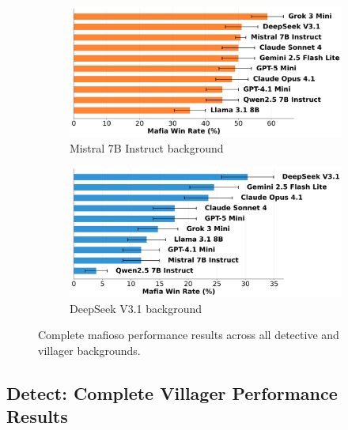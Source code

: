 \documentclass{article}
\begin{document}
\begin{figure}[htbp]
    \begin{subfigure}[b]{0.48\textwidth}
        \centering
        \includegraphics[width=\textwidth]{../results/mafioso_mistral_7b_instruct_db_benchmark.png}
        \caption{Mistral 7B Instruct background}
        \label{fig:mafioso_mistral_appendix}
    \end{subfigure}
    \hfill
    \begin{subfigure}[b]{0.48\textwidth}
        \centering
        \includegraphics[width=\textwidth]{../results/mafioso_deepseek_v3.1_db_benchmark.png}
        \caption{DeepSeek V3.1 background}
        \label{fig:mafioso_deepseek_appendix}
    \end{subfigure}
    \caption{Complete mafioso performance results across all detective and villager backgrounds.}
    \label{fig:mafioso_complete}
\end{figure}

\subsection{Detect: Complete Villager Performance Results}
\end{document}
